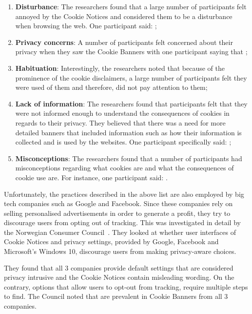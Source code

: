 \documentclass[../main.tex]{subfiles}
\begin{document}
\begin{enumerate}
    \item \textbf{Disturbance}: The researchers found that a large number of participants felt annoyed by the Cookie Notices and considered them to be a disturbance when browsing the web. One participant said: ;
    \item \textbf{Privacy concerns}: A number of participants felt concerned about their privacy when they saw the Cookie Banners with one participant saying that ;
    \item \textbf{Habituation}: Interestingly, the researchers noted that because of the prominence of the cookie disclaimers, a large number of participants felt they were used of them and therefore, did not pay attention to them;
    \item \textbf{Lack of information}: The researchers found that participants felt that they were not informed enough to understand the consequences of cookies in regards to their privacy. They believed that there was a need for more detailed banners that included information such as how their information is collected and is used by the websites. One participant specifically said:  ;
    \item \textbf{Misconceptions}: The researchers found that a number of participants had misconceptions regarding what cookies are and what the consequences of cookie use are. For instance, one participant said: .
\end{enumerate}

Unfortunately, the practices described in the above list are also employed by big tech companies such as Google and Facebook. Since these companies rely on selling personalised advertisements in order to generate a profit, they try to discourage users from opting out of tracking. This was investigated in detail by the Norwegian Consumer Council~\cite{council2018deceived}. They looked at whether user interfaces of Cookie Notices and privacy settings, provided by Google, Facebook and Microsoft’s Windows 10, discourage users from making privacy-aware choices. 

They found that all 3 companies provide default settings that are considered privacy intrusive and the Cookie Notices contain misleading wording. On the contrary,  options that allow users to opt-out from tracking, require multiple steps to find. The Council noted that  are prevalent in Cookie Banners from all 3 companies. 
\end{document}
